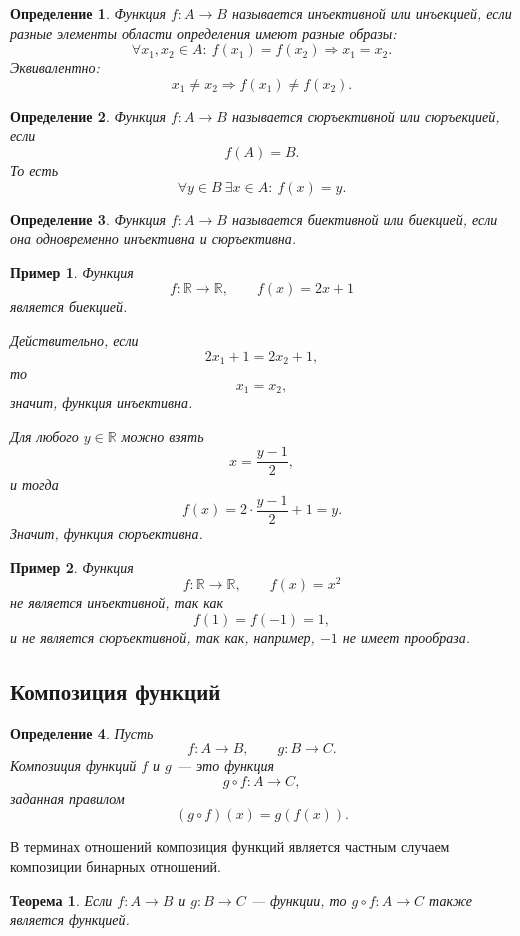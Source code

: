 \documentclass[12pt,a4paper]{article}
\newtheorem{definition}{Определение}
\newtheorem{theorem}{Теорема}
\newtheorem{example}{Пример}
\begin{document}
\begin{definition}
Функция $f:A\to B$ называется \emph{инъективной} или \emph{инъекцией}, если разные элементы области определения имеют разные образы:
\[
\forall x_1,x_2\in A:\ f(x_1)=f(x_2)\Rightarrow x_1=x_2.
\]
Эквивалентно:
\[
x_1\ne x_2\Rightarrow f(x_1)\ne f(x_2).
\]
\end{definition}

\begin{definition}
Функция $f:A\to B$ называется \emph{сюръективной} или \emph{сюръекцией}, если
\[
f(A)=B.
\]
То есть
\[
\forall y\in B\ \exists x\in A:\ f(x)=y.
\]
\end{definition}

\begin{definition}
Функция $f:A\to B$ называется \emph{биективной} или \emph{биекцией}, если она одновременно инъективна и сюръективна.
\end{definition}

\begin{example}
Функция
\[
f:\mathbb R\to\mathbb R,\qquad f(x)=2x+1
\]
является биекцией.

Действительно, если
\[
2x_1+1=2x_2+1,
\]
то
\[
x_1=x_2,
\]
значит, функция инъективна.

Для любого $y\in\mathbb R$ можно взять
\[
x=\frac{y-1}{2},
\]
и тогда
\[
f(x)=2\cdot \frac{y-1}{2}+1=y.
\]
Значит, функция сюръективна.
\end{example}

\begin{example}
Функция
\[
f:\mathbb R\to\mathbb R,\qquad f(x)=x^2
\]
не является инъективной, так как
\[
f(1)=f(-1)=1,
\]
и не является сюръективной, так как, например, $-1$ не имеет прообраза.
\end{example}

\subsection{Композиция функций}

\begin{definition}
Пусть
\[
f:A\to B,\qquad g:B\to C.
\]
\emph{Композиция} функций $f$ и $g$ --- это функция
\[
g\circ f:A\to C,
\]
заданная правилом
\[
(g\circ f)(x)=g(f(x)).
\]
\end{definition}

В терминах отношений композиция функций является частным случаем композиции бинарных отношений.

\begin{theorem}
Если $f:A\to B$ и $g:B\to C$ --- функции, то $g\circ f:A\to C$ также является функцией.
\end{theorem}
\end{document}
